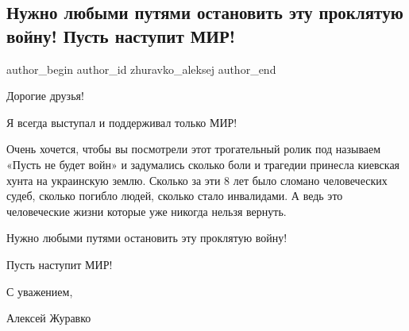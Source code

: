 
 
 
 
 
 
\subsection{Нужно любыми путями остановить эту проклятую войну! Пусть наступит МИР!}
\label{sec:01_12_2021.fb.zhuravko_aleksej.3.vojna_mir}
 
\ifcmt
 author_begin
   author_id zhuravko_aleksej
 author_end
\fi

Дорогие друзья! 

Я всегда выступал и поддерживал только МИР! 


Очень хочется, чтобы вы посмотрели этот трогательный ролик под называем «Пусть
не будет войн» и задумались сколько боли и трагедии принесла киевская хунта на
украинскую землю. Сколько за эти 8 лет было сломано человеческих судеб, сколько
погибло людей, сколько стало инвалидами. А ведь это человеческие жизни которые
уже никогда нельзя вернуть. 


Нужно любыми путями остановить эту проклятую войну!

Пусть наступит МИР! 

С уважением, 

Алексей Журавко
